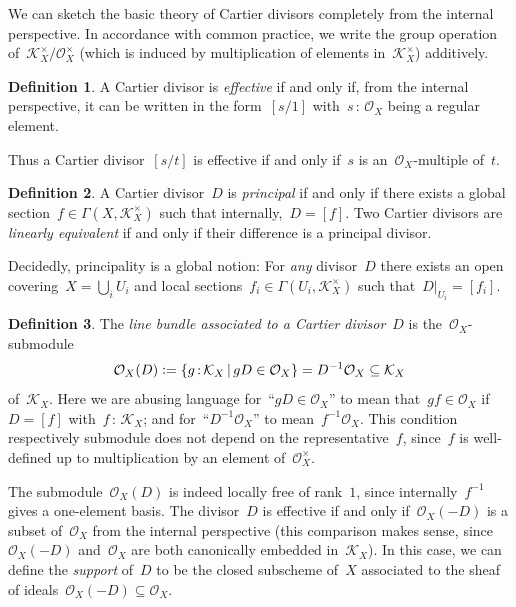 \documentclass[10pt,reqno,a4paper]{amsbook}
\theoremstyle{definition}
\newtheorem{defn}{Definition}[section]
\theoremstyle{plain}
\theoremstyle{remark}
\renewcommand{\O}{\mathcal{O}}
\newcommand{\K}{\mathcal{K}}
\newcommand{\?}{\,{:}\,}
\renewcommand{\_}{\mathpunct{.}\,}
\newcommand{\effective}{ef{}fective\xspace}
\newcommand{\defeq}{\vcentcolon=}
\begin{document}
We can sketch the basic theory of Cartier divisors completely from the internal
perspective. In accordance with common practice, we write the group
operation of~$\K_X^\times/\O_X^\times$ (which is induced by multiplication of elements
in~$\K_X^\times$) additively.

\begin{defn}\label{defn:effective-cartier-divisor}
A Cartier divisor is \emph{\effective} if and only if, from the
internal perspective, it can be written in the form~$[s/1]$ with~$s\?\O_X$
being a regular element.\end{defn}

Thus a Cartier divisor~$[s/t]$ is \effective if and only if~$s$ is
an~$\O_X$-multiple of~$t$.

\begin{defn}A Cartier divisor~$D$ is \emph{principal} if and only if there
exists a global section~$f \in \Gamma(X,\K_X^\times)$ such that internally,~$D = [f]$.
Two Cartier divisors are \emph{linearly equivalent} if and only if their
difference is a principal divisor.
\end{defn}

Decidedly, principality is a global notion: For \emph{any} divisor~$D$
there exists an open covering~$X = \bigcup_i U_i$ and local sections~$f_i \in
\Gamma(U_i, \K_X^\times)$ such that~$D|_{U_i} = [f_i]$.

\begin{defn}\label{defn:line-bundle-of-divisor}
The \emph{line bundle associated to a Cartier divisor}~$D$
is the~$\O_X$-submodule
\[ \O_X(D) \defeq \{ g \? \K_X \,|\, g D \in \O_X \} = D^{-1} \O_X \subseteq \K_X
\]
of~$\K_X$. Here we are abusing language for~``$gD \in \O_X$'' to mean that~$gf
\in \O_X$ if~$D = [f]$ with~$f\?\K_X$; and for~``$D^{-1} \O_X$'' to
mean~$f^{-1}\O_X$. This condition respectively submodule does not depend on the
representative~$f$, since~$f$ is well-defined up to multiplication by an element
of~$\O_X^\times$.\end{defn}

The submodule~$\O_X(D)$ is indeed locally free of rank~$1$, since
internally~$f^{-1}$ gives a one-element basis. The divisor~$D$ is \effective if
and only if~$\O_X(-D)$ is a subset of~$\O_X$ from the internal perspective
(this comparison makes sense, since~$\O_X(-D)$ and~$\O_X$ are both canonically
embedded in~$\K_X$). In
this case, we can define the \emph{support} of~$D$ to be the closed subscheme
of~$X$ associated to the sheaf of ideals~$\O_X(-D) \subseteq \O_X$.
\end{document}

